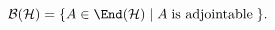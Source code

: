 \begin{equation}
    \label{eq:BH}
    \mathcal{B}(\mathcal{H}) = \{A \in \End(\mathcal{H}) \; | \; 
    A \; \textrm{is adjointable} \; \}.
\end{equation}


